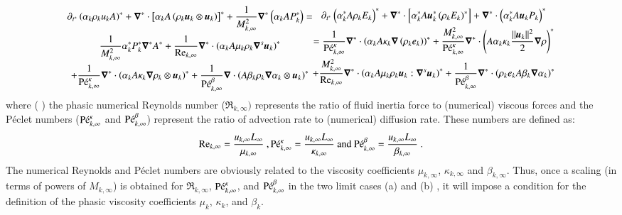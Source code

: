 \documentclass[preprint,10pt]{elsarticle}
\begin{document}
\begin{enumerate}
\begin{subequations}
\begin{multline}
\partial_{t^*} \left( \alpha_k \rho_k u_k A \right)^* + \grad^* \cdot \left[ \alpha_k A \left( \rho_k \mbold u_k \otimes \mbold u_k\right)\right]^* + \frac{1}{M^2_{k,
\infty}}\grad^* \left( \alpha_k A P_k^* \right) = \\
  \frac{1}{M^2_{k,\infty}} \alpha_k^* P^*_k \grad^* A^*  
+ \frac{1}{\Re_{k,\infty}}\grad^* \cdot \left( \alpha_k A \mu_k \rho_k \grad^s \mbold u_k \right)^* \\ 
+ \frac{1}{\Pe_{k,\infty}^\kappa} \grad^* \cdot\left( \alpha_k A \kappa_k \grad \rho_k \otimes \mbold u_k \right)^* 
+ \frac{1}{\Pe_{k,\infty}^\beta} \grad \cdot \left( A \beta_k \rho_k \grad \alpha_k \otimes \mbold u_k \right)^*
\end{multline}
%
\begin{multline}\label{eq:sev_equ-with-diss-terms-ener_case_one_scaled}
\partial_{t^*} \left( \alpha_k^* A \rho_k E_k \right)^* + \grad^* \cdot \left[ \alpha_k^* A \mbold u_k^*  \left( \rho_k E_k \right)^* \right] +  \grad^* \cdot 
\left(\alpha_k^* A \mbold u_k P_k \right)^*  \\ =
\frac{1}{\Pe_{k,\infty}^\kappa} \grad^* \cdot \left( \alpha_k A \kappa_k \grad \left( \rho_k e_k \right) \right)^* 
+ \frac{M^2_{k,\infty}}{\Pe_{k,\infty}^\kappa} \grad^* \cdot \left( A\alpha_k \kappa_k \frac{||\mbold u_k||^2}{2} \grad \rho \right)^*  \\
+ \frac{M^2_{k,\infty}}{\Re_{k,\infty}} \grad^* \cdot \left( \alpha_k A \mu_k \rho_k \mbold u_k : \grad^s \mbold u_k\right)^* 
+ \frac{1}{\Pe_{k,\infty}^\beta } \grad^*\cdot \left( \rho_k e_k A \beta_k \grad \alpha_k \right)^*
\end{multline}
%
\end{subequations}
%
where ( )
the phasic numerical Reynolds number ($\Re_{k,\infty})$ represents the ratio of fluid inertia 
force to (numerical) viscous forces and 
the P\'eclet numbers ($\textrm{P\'e}_{k,\infty}^\kappa$ and $\textrm{P\'e}_{k,\infty}^\beta$) represent the ratio of advection rate to (numerical) diffusion rate. These numbers are defined as:
%
\begin{equation}
\label{eq:ref_numb}
\textrm{Re}_{k,\infty} = \frac{u_{k,\infty} L_\infty}{\mu_{k,\infty}} \ ,
\textrm{P\'e}_{k,\infty}^\kappa = \frac{u_{k,\infty} L_\infty}{\kappa_{k,\infty}} \text{ and }
\textrm{P\'e}_{k,\infty}^\beta = \frac{u_{k,\infty} L_\infty}{\beta_{k,\infty}} \ .
\end{equation}
%
The numerical Reynolds and P\'eclet numbers are obviously related to the 
viscosity coefficients $\mu_{k,\infty}$, $\kappa_{k,\infty}$ and $\beta_{k,\infty}$. Thus, once a scaling (in terms of powers of $M_{k,\infty}$) 
is obtained for $\Re_{k,\infty}$, $\textrm{P\'e}_{k,\infty}^\kappa$, and $\textrm{P\'e}_{k,\infty}^\beta$ in the two limit cases (a) and (b)  , it will 
impose a condition for the definition of the phasic viscosity coefficients $\mu_k$, $\kappa_k$, and $\beta_k$. 
\end{enumerate} 
\end{document}
